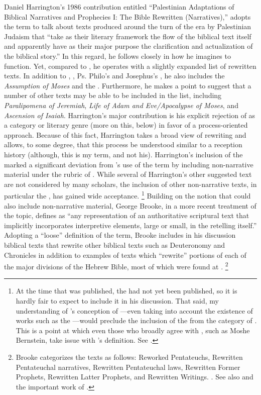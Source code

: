 Daniel Harrington's 1986 contribution entitled ``Palestinian Adaptations of Biblical Narratives and Prophecies I: The Bible Rewritten (Narratives),'' adopts the term \rwb to talk about texts produced around the turn of the era by Palestinian Judaism that ``take as their literary framework the flow of the biblical text itself and apparently have as their major purpose the clarification and actualization of the biblical story.''\autocite[239]{harrington_kraft-nickelsburg1986} In this regard, he follows \vermes closely in how he imagines \rwb to function. Yet, compared to \vermes, he operates with a slightly expanded list of rewritten texts. In addition to \jub, \ga, Ps. Philo's \lab and Josephus's \ant, he also includes the \emph{Assumption of Moses} and the \templescroll. Furthermore, he makes a point to suggest that a number of other texts may be able to be included in the list, including \emph{Paralipomena of Jeremiah}, \emph{Life of Adam and Eve/Apocalypse of Moses}, and \emph{Ascension of Isaiah}. Harrington's major contribution is his explicit rejection of \rwb as a category or literary genre (more on this, below) in favor of a process-oriented approach. Because of this fact, Harrington takes a broad view of rewriting and allows, to some degree, that this process be understood similar to a reception history (although, this is my term, and not his). Harrington's inclusion of the \templescroll marked a significant deviation from \vermes's use of the term by including non-narrative material under the rubric of \rwb. While several of Harrington's other suggested text are not considered \rwb by many scholars, the inclusion of other non-narrative texts, in particular the \templescroll, has gained wide acceptance.%
%
\footnote{At the time that  was published, the \templescroll had not yet been published, so it is hardly fair to expect \vermes to include it in his discussion. That said, my understanding of \vermes's conception of \rwb---even taking into account the existence of works such as the \templescroll---would preclude the inclusion of the \templescroll from the category of \rwb. This is a point at which even those who broadly agree with \vermes, such as Moshe Bernstein, take issue with \vermes's definition. See \cite[183--184]{bernstein_textus2005}.}
%
Building on the notion that \rwb could also include non-narrative material, George Brooke, in a more recent treatment of the topic, defines \rwb as ``any representation of an authoritative scriptural text that implicitly incorporates interpretive elements, large or small, in the retelling itself.''\autocite[777]{brooke_schiffman-vanderkam2000} Adopting a ``loose'' definition of the term, Brooke includes in his discussion biblical texts that rewrite other biblical texts such as Deuteronomy and Chronicles in addition to examples of texts which ``rewrite'' portions of each of the major divisions of the Hebrew Bible, most of which were found at \qumran.%
\footnote{Brooke categorizes the texts as follows: Reworked Pentateuchs, Rewritten Pentateuchal narratives, Rewritten Pentateuchal laws, Rewritten Former Prophets, Rewritten Latter Prophets, and Rewritten Writings. \cite[778--780]{brooke_schiffman-vanderkam2000}. See also \cite{brooke_herbert-tov2002} and the important work of \cite{falk2007}.}

